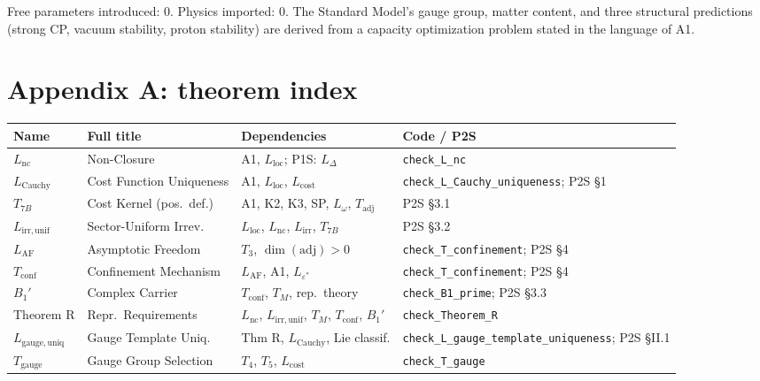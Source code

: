 \documentclass[11pt]{article}
\begin{document}
Free parameters introduced: 0.  Physics imported: 0.  The Standard Model's gauge group, matter content, and three structural predictions (strong CP, vacuum stability, proton stability) are derived from a capacity optimization problem stated in the language of A1.


\section{Appendix A: theorem index}
\label{app:theorems}

\begin{center}
\footnotesize
\begin{tabular}{lp{3.2cm}p{4.5cm}l}
\toprule
\textbf{Name} & \textbf{Full title} & \textbf{Dependencies} & \textbf{Code / P2S} \\
\midrule
$L_{\mathrm{nc}}$ & Non-Closure & A1, $L_{\mathrm{loc}}$; P1S: $L_\Delta$ & \texttt{check\_L\_nc} \\
$L_{\mathrm{Cauchy}}$ & Cost Function Uniqueness & A1, $L_{\mathrm{loc}}$, $L_{\mathrm{cost}}$ & \texttt{check\_L\_Cauchy\_uniqueness}; P2S \S1 \\
$T_{7B}$ & Cost Kernel (pos.\ def.) & A1, K2, K3, SP, $L_\omega$, $T_{\mathrm{adj}}$ & P2S \S3.1 \\
$L_{\mathrm{irr,unif}}$ & Sector-Uniform Irrev. & $L_{\mathrm{loc}}$, $L_{\mathrm{nc}}$, $L_{\mathrm{irr}}$, $T_{7B}$ & P2S \S3.2 \\
$L_{\mathrm{AF}}$ & Asymptotic Freedom & $T_3$, $\dim(\mathrm{adj}) > 0$ & \texttt{check\_T\_confinement}; P2S \S4 \\
$T_{\mathrm{conf}}$ & Confinement Mechanism & $L_{\mathrm{AF}}$, A1, $L_{\varepsilon^*}$ & \texttt{check\_T\_confinement}; P2S \S4 \\
$B_1'$ & Complex Carrier & $T_{\mathrm{conf}}$, $T_M$, rep.\ theory & \texttt{check\_B1\_prime}; P2S \S3.3 \\
Theorem R & Repr.\ Requirements & $L_{\mathrm{nc}}$, $L_{\mathrm{irr,unif}}$, $T_M$, $T_{\mathrm{conf}}$, $B_1'$ & \texttt{check\_Theorem\_R} \\
$L_{\mathrm{gauge,uniq}}$ & Gauge Template Uniq. & Thm R, $L_{\mathrm{Cauchy}}$, Lie classif. & \texttt{check\_L\_gauge\_template\_uniqueness}; P2S \S II.1 \\
$T_{\mathrm{gauge}}$ & Gauge Group Selection & $T_4$, $T_5$, $L_{\mathrm{cost}}$ & \texttt{check\_T\_gauge} \\

\end{tabular}
\end{center}
\end{document}
